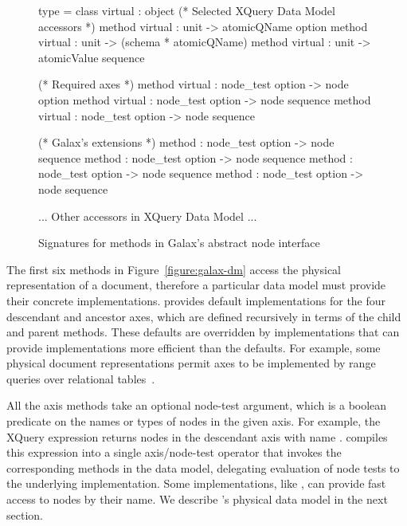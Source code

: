 \begin{figure*}
\begin{small}
\begin{code}
type  = 
class virtual  : 
object
  (* Selected XQuery Data Model accessors *)
  method virtual    : unit -> atomicQName option
  method virtual         : unit -> (schema * atomicQName)
  method virtual  : unit -> atomicValue sequence

  (* Required axes *)
  method virtual       : node_test option -> node option
  method virtual        : node_test option -> node sequence
  method virtual    : node_test option -> node sequence

  (* Galax's extensions *)
  method   : node_test option -> node sequence
  method           : node_test option -> node sequence
  method     : node_test option -> node sequence
  method             : node_test option -> node sequence

  ... Other accessors in XQuery Data Model ...
\end{code}
\end{small}
\caption{Signatures for methods in Galax's abstract node interface}
\label{figure :galax-dm}
\end{figure*}

The first six methods in Figure~\ref{figure:galax-dm} access the
physical representation of a document, therefore a particular data
model must provide their concrete implementations.  \Galax{} provides
default implementations for the four {descendant} and ancestor axes,
which are defined recursively in terms of the {child} and {parent}
methods.  These defaults are overridden by implementations that can
provide implementations more efficient than the defaults.  For
example, some physical document representations permit axes to be
implemented by range queries over relational
tables~\cite{grust03staircase}.

All the axis methods take an optional node-test argument, which is a
boolean predicate on the names or types of nodes in the given axis.
For example, the XQuery expression  returns
nodes in the descendant axis with name .  \Galax{} compiles
this expression into a single axis/node-test operator that invokes the
corresponding methods in the data model, delegating evaluation of node
tests to the underlying implementation.  Some implementations, like
\padx{}, can provide fast access to nodes by their name.  We describe
\padx{}'s physical data model in the next section.

